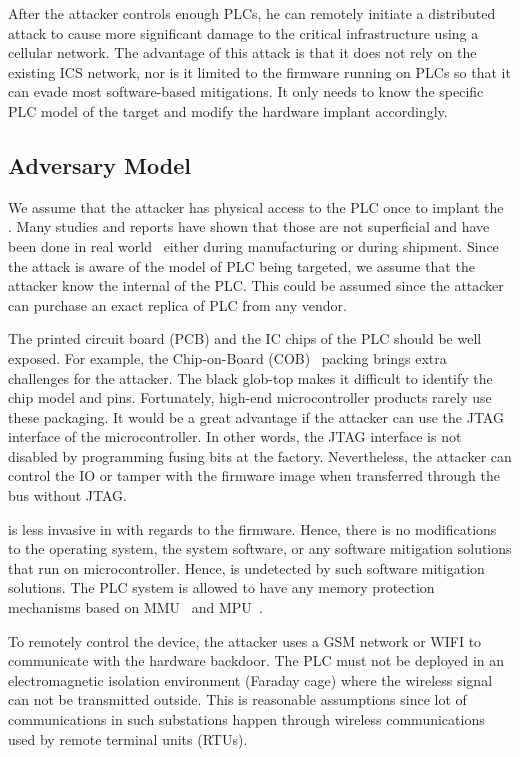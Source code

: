 After the attacker controls enough PLCs, he can remotely initiate a distributed attack to cause more significant damage to the critical infrastructure using a cellular network. The advantage of this attack is that it does not rely on the existing ICS network, nor is it limited to the firmware running on PLCs so that it can evade most software-based mitigations. It only needs to know the specific PLC model of the target and modify the hardware implant accordingly.


\subsection{Adversary Model}

We assume that the attacker has physical access to the PLC once to implant the \name. Many studies and reports have shown that those are not superficial and have been done in real world~\cite{harrison2021malicious, o2015special, robertson2018big} either during manufacturing or during shipment. Since the attack is aware of the model of PLC being targeted, we assume that the attacker know the internal of the PLC. This could be assumed since the attacker can purchase an exact replica of PLC from any vendor. 


The printed circuit board (PCB) and the IC chips of the PLC should be well exposed. For example, the Chip-on-Board (COB)~\cite{lau1994chip} packing brings extra challenges for the attacker. The black glob-top makes it difficult to identify the chip model and pins. Fortunately, high-end microcontroller products rarely use these packaging. It would be a great advantage if the attacker can use the JTAG interface of the microcontroller. In other words, the JTAG interface is not disabled by programming fusing bits at the factory. Nevertheless, the attacker can control the IO or tamper with the firmware image when transferred through the bus without JTAG.

\name is less invasive in with regards to the firmware. Hence, there is no modifications to the operating system, the system software, or any software mitigation solutions that run on microcontroller. Hence, \name is undetected by such software mitigation solutions. The PLC system is allowed to have any memory protection mechanisms based on MMU~\cite{shalan2000dynamic} and MPU~\cite{kim2018securing}.

To remotely control the device, the attacker uses a GSM network or WIFI to communicate with the hardware backdoor. The PLC must not be deployed in an electromagnetic isolation environment (Faraday cage) where the wireless signal can not be transmitted outside. This is reasonable assumptions since lot of communications in such substations happen through wireless communications used by remote terminal units (RTUs).




